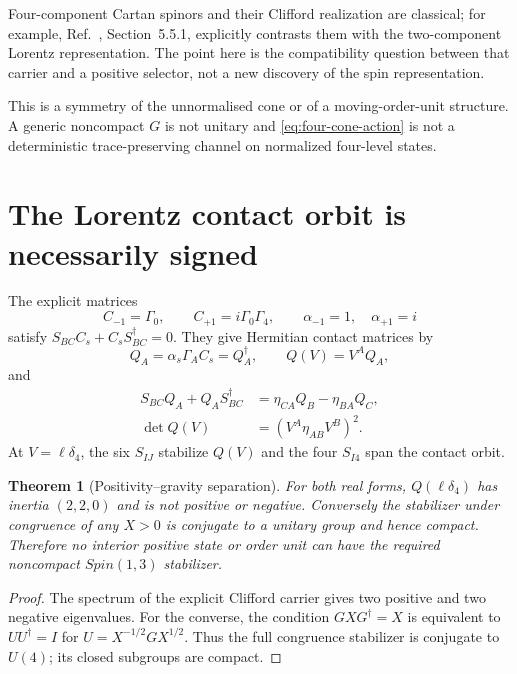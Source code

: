 \documentclass[11pt]{article}
\newtheorem{theorem}{Theorem}[section]
\theoremstyle{remark}\newtheorem{remark}[theorem]{Remark}
\begin{document}
Four-component Cartan spinors and their Clifford realization are classical;
for example, Ref.~\cite{WestmanZlosnikIntro}, Section~5.5.1, explicitly
contrasts them with the two-component Lorentz representation.
The point here is the compatibility question between that carrier and a
positive selector, not a new discovery of the spin representation.


This is a symmetry of the unnormalised cone or of a moving-order-unit structure.  A generic
noncompact $G$ is not unitary and \eqref{eq:four-cone-action} is not a deterministic
trace-preserving channel on normalized four-level states.

\section{The Lorentz contact orbit is necessarily signed}

The explicit matrices
\begin{equation}
 C_{-1}=\Gamma_0,\qquad C_{+1}=i\Gamma_0\Gamma_4,
 \qquad\alpha_{-1}=1,\quad\alpha_{+1}=i
 \label{eq:contact-conventions}
\end{equation}
satisfy $S_{BC}C_s+C_sS_{BC}^\dagger=0$.
They give Hermitian contact matrices by
\begin{equation}
 Q_A=\alpha_s\Gamma_AC_s=Q_A^\dagger,\qquad Q(V)=V^AQ_A,
 \label{eq:contact-matrices}
\end{equation}
and
\begin{align}
 S_{BC}Q_A+Q_AS_{BC}^\dagger
 &=\eta_{CA}Q_B-\eta_{BA}Q_C,\nonumber\\
 \det Q(V)&=(V^A\eta_{AB}V^B)^2.
 \label{eq:contact-covariance}
\end{align}
At $V=\ell\delta_4$, the six $S_{IJ}$ stabilize $Q(V)$ and the four $S_{I4}$ span the
contact orbit.

\begin{theorem}[Positivity--gravity separation]
\label{thm:signed-contact}
For both real forms, $Q(\ell\delta_4)$ has inertia $(2,2,0)$ and is not positive or
negative.  Conversely the stabilizer under congruence of any $X>0$ is conjugate to a
unitary group and hence compact.  Therefore no interior positive state or order unit can
have the required noncompact $Spin(1,3)$ stabilizer.
\end{theorem}

\begin{proof}
The spectrum of the explicit Clifford carrier gives two positive and two negative
eigenvalues.  For the converse, the condition $GXG^\dagger=X$ is equivalent to
$UU^\dagger=I$ for $U=X^{-1/2}GX^{1/2}$.
Thus the full congruence stabilizer is conjugate to $U(4)$; its closed
subgroups are compact.
\end{proof}
\end{document}
